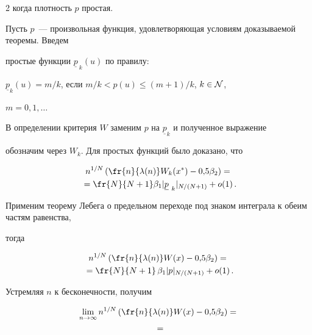 \begin{multicols}{2}
когда плотность $p$ простая.





Пусть $p$~--- произвольная функция, удовлетворяющая условиям доказываемой теоремы. Введем


простые функции $\underline{p}_{~k}(u)$ по правилу:


$\underline{p}_{k}(u)=m/k$, если $m/k<p(u)\leqslant (m+1)/k$, $k\in {\cal N}$,


$m=0,1,\ldots$





В определении критерия $W$ заменим $p$ на $\underline{p}_{k}$ и полученное выражение


обозначим через $W_k$. Для простых функций было доказано, что


\begin{multline*}


n^{1/N}\left(\fr{n}{\lambda(n)}W_k(x^*)-0{,}5\beta_2\right)={}\\


{}=


\fr{N}{N+1} \beta_1 |\underline{p}_{~k}|_{N/(N+1)} + o(1)\,.


\end{multline*}





Применим теорему Лебега о предельном переходе под знаком интеграла к обеим частям равенства,


тогда


\begin{multline*}


n^{1/N}\left(\fr{n}{\lambda(n)}W(x)-0{,}5\beta_2\right) ={}\\


{}=


\fr{N}{N+1}\, \beta_1 |p|_{N/(N+1)}+o(1)\,.


\end{multline*}





Устремляя $n$ к бесконечности, получим


\begin{multline*}


\liml{n\rightarrow


\infty}n^{1/N}\left(\fr{n}{\lambda(n)}W(x)-0{,}5\beta_2\right) ={}\\


{}=



\end{multline*}
\end{multicols}
